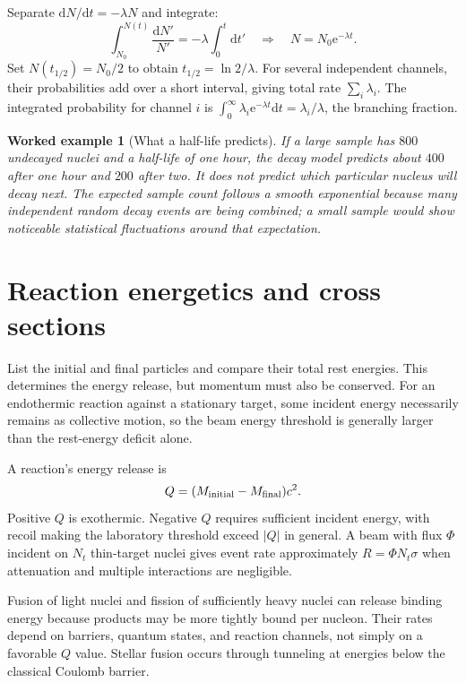 \documentclass[11pt,oneside]{book}
\newcommand{\dd}{\mathrm{d}}
\newcommand{\ee}{\mathrm{e}}
\theoremstyle{reviewstyle}
\newtheorem{example}{Worked example}[chapter]
\begin{document}
Separate $\dd N/\dd t=-\lambda N$ and integrate:
\begin{equation}
\int_{N_0}^{N(t)}\frac{\dd N'}{N'}=-\lambda\int_0^t\dd t'
\quad\Longrightarrow\quad N=N_0\ee^{-\lambda t}.
\end{equation}
Set $N(t_{1/2})=N_0/2$ to obtain $t_{1/2}=\ln2/\lambda$. For several independent channels, their probabilities add over a short interval, giving total rate $\sum_i\lambda_i$. The integrated probability for channel $i$ is $\int_0^\infty\lambda_i\ee^{-\lambda t}\dd t=\lambda_i/\lambda$, the branching fraction.

\begin{example}[What a half-life predicts]
If a large sample has $800$ undecayed nuclei and a half-life of one hour, the decay model predicts about $400$ after one hour and $200$ after two. It does not predict which particular nucleus will decay next. The expected sample count follows a smooth exponential because many independent random decay events are being combined; a small sample would show noticeable statistical fluctuations around that expectation.
\end{example}

\section{Reaction energetics and cross sections}
List the initial and final particles and compare their total rest energies. This determines the energy release, but momentum must also be conserved. For an endothermic reaction against a stationary target, some incident energy necessarily remains as collective motion, so the beam energy threshold is generally larger than the rest-energy deficit alone.

A reaction's energy release is
\begin{equation}Q=(M_{\rm initial}-M_{\rm final})c^2.\end{equation}
Positive $Q$ is exothermic. Negative $Q$ requires sufficient incident energy, with recoil making the laboratory threshold exceed $|Q|$ in general. A beam with flux $\Phi$ incident on $N_t$ thin-target nuclei gives event rate approximately $R=\Phi N_t\sigma$ when attenuation and multiple interactions are negligible.

Fusion of light nuclei and fission of sufficiently heavy nuclei can release binding energy because products may be more tightly bound per nucleon. Their rates depend on barriers, quantum states, and reaction channels, not simply on a favorable $Q$ value. Stellar fusion occurs through tunneling at energies below the classical Coulomb barrier.
\end{document}
